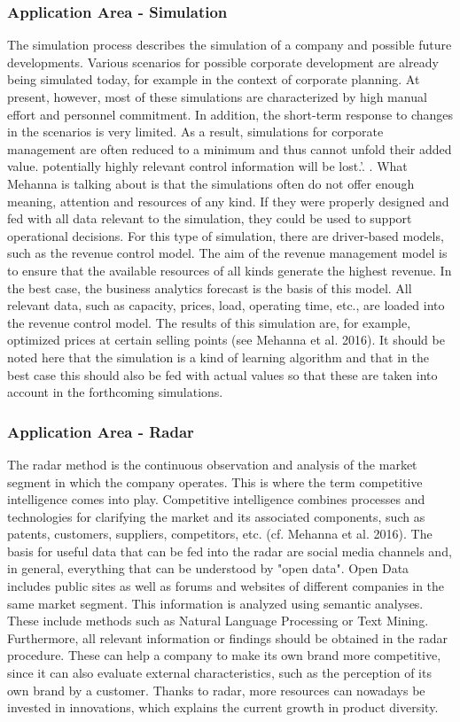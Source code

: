 \documentclass[12pt,twocolumn,twoside]{conference}   %
\begin{document}
\subsubsection{Application Area - Simulation}
The simulation process describes the simulation of a company and possible future developments. Various scenarios for possible corporate development are already being simulated today, for example in the context of corporate planning. At present, however, most of these simulations are characterized by high manual effort and personnel commitment. In addition, the short-term response to changes in the scenarios is very limited. As a result, simulations for corporate management are often reduced to a minimum and thus cannot unfold their added value. potentially highly relevant control information will be lost.'. \cite{Mehanna et al. 2016}. What Mehanna is talking about is that the simulations often do not offer enough meaning, attention and resources of any kind. If they were properly designed and fed with all data relevant to the simulation, they could be used to support operational decisions. For this type of simulation, there are driver-based models, such as the revenue control model. The aim of the revenue management model is to ensure that the available resources of all kinds generate the highest revenue. In the best case, the business analytics forecast is the basis of this model. All relevant data, such as capacity, prices, load, operating time, etc., are loaded into the revenue control model. The results of this simulation are, for example, optimized prices at certain selling points (see Mehanna et al. 2016). It should be noted here that the simulation is a kind of learning algorithm and that in the best case this should also be fed with actual values so that these are taken into account in the forthcoming simulations. 


\subsubsection{Application Area - Radar}
The radar method is the continuous observation and analysis of the market segment in which the company operates. This is where the term competitive intelligence comes into play. Competitive intelligence combines processes and technologies for clarifying the market and its associated components, such as patents, customers, suppliers, competitors, etc. (cf. Mehanna et al. 2016). The basis for useful data that can be fed into the radar are social media channels and, in general, everything that can be understood by "open data". Open Data includes public sites as well as forums and websites of different companies in the same market segment. This information is analyzed using semantic analyses. These include methods such as Natural Language Processing or Text Mining. Furthermore, all relevant information or findings should be obtained in the radar procedure. These can help a company to make its own brand more competitive, since it can also evaluate external characteristics, such as the perception of its own brand by a customer. Thanks to radar, more resources can nowadays be invested in innovations, which explains the current growth in product diversity.
\end{document}
